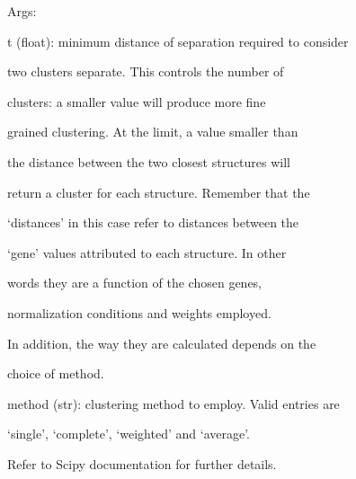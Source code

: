\documentclass[letterpaper,10pt,english]{sphinxmanual}
\begin{document}
\begin{fulllineitems}
\begin{fulllineitems}
\begin{DUlineblock}{0em}
\item[] Args:
\item[]
\begin{DUlineblock}{\DUlineblockindent}
\item[] t (float): minimum distance of separation required to consider
\item[]
\begin{DUlineblock}{\DUlineblockindent}
\item[] two clusters separate. This controls the number of
\item[] clusters: a smaller value will produce more fine
\item[] grained clustering. At the limit, a value smaller than
\item[] the distance between the two closest structures will
\item[] return a cluster for each structure. Remember that the
\item[] `distances' in this case refer to distances between the
\item[] `gene' values attributed to each structure. In other
\item[] words they are a function of the chosen genes,
\item[] normalization conditions and weights employed.
\item[] In addition, the way they are calculated depends on the
\item[] choice of method.
\end{DUlineblock}
\item[] method (str): clustering method to employ. Valid entries are
\item[]
\begin{DUlineblock}{\DUlineblockindent}
\item[] `single', `complete', `weighted' and `average'.
\item[] Refer to Scipy documentation for further details.
\end{DUlineblock}
\end{DUlineblock}
\end{DUlineblock}


\end{fulllineitems}
\end{fulllineitems}
\end{document}
